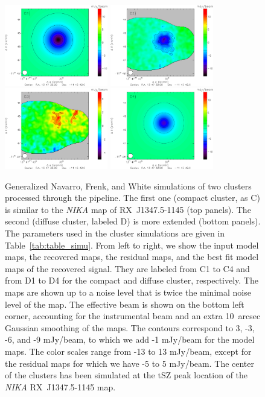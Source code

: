 \begin{figure}
	\includegraphics[width=4.5cm]{Figure/Simulation_RXJ1347_model_diffus}
	\includegraphics[width=4.5cm]{Figure/Simulation_RXJ1347_diffus}
	\includegraphics[width=4.5cm]{Figure/Simulation_RXJ1347_resi_diffus}
	\includegraphics[width=4.5cm]{Figure/Simulation_RXJ1347_bestfit_diffus}
	\caption{Generalized Navarro, Frenk, and White simulations of two clusters processed through the pipeline. The first one (compact cluster, as C) is similar to the {\it NIKA} map of \mbox{RX~J1347.5-1145} (top panels). The second (diffuse cluster, labeled D) is more extended (bottom panels). The parameters used in the cluster simulations are given in Table~\ref{tab:table_simu}. From left to right, we show the input model maps, the recovered maps, the residual maps, and the best fit model maps of the recovered signal. They are labeled from C1 to C4 and from D1 to D4 for the compact and diffuse cluster, respectively. The maps are shown up to a noise level that is twice the minimal noise level of the map. The effective beam is shown on the bottom left corner, accounting for the instrumental beam and an extra 10~arcsec Gaussian smoothing of the maps. The contours correspond to  3, -3, -6, and -9 mJy/beam, to which we add -1 mJy/beam for the model maps. The color scales range from -13 to 13 mJy/beam, except for the residual maps for which we have -5 to 5 mJy/beam. The center of the clusters has been simulated at the tSZ peak location of the {\it NIKA}  \mbox{RX~J1347.5-1145} map.}
        \label{fig:rxj_simu_map}
	\end{figure}

